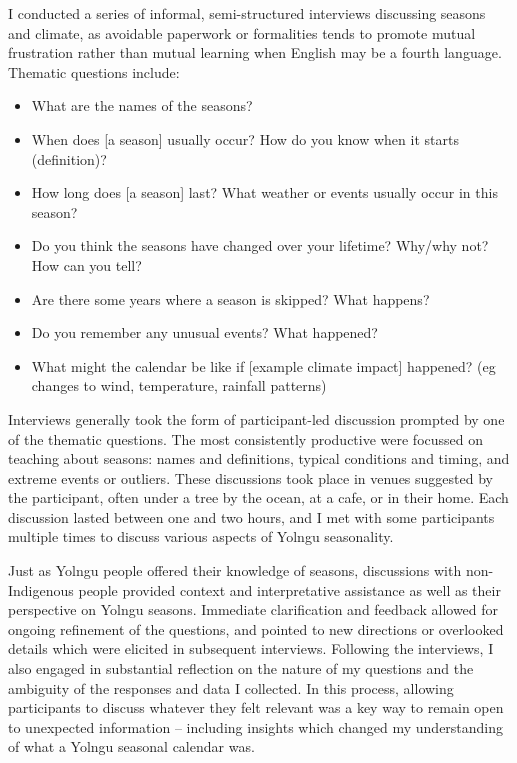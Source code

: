 I conducted a series of informal, semi-structured interviews discussing seasons
and climate, as avoidable paperwork or formalities tends to promote mutual
frustration rather than mutual learning when English may be a fourth language.
Thematic questions include:
\begin{itemize}
\item What are the names of the seasons?
\item When does [a season] usually occur?  How do you know when it starts (definition)?
\item How long does [a season] last?  What weather or events usually occur in this season?
\item Do you think the seasons have changed over your lifetime?  Why/why not?  How can you tell?
\item Are there some years where a season is skipped?  What happens?
\item Do you remember any unusual events?  What happened?
\item What might the calendar be like if [example climate impact] happened?
      (eg changes to wind, temperature, rainfall patterns)
\end{itemize}

Interviews generally took the form of participant-led discussion prompted
by one of the thematic questions.  The most consistently productive were
focussed on teaching about seasons: names and definitions, typical conditions
and timing, and extreme events or outliers.
%
These discussions took place in venues suggested by the participant, often
under a tree by the ocean, at a cafe, or in their home.  Each discussion
lasted between one and two hours, and I met with some participants multiple times
to discuss various aspects of Yolngu seasonality.

Just as Yolngu people offered their knowledge of seasons, discussions with
non-Indigenous people provided context and interpretative assistance as well
as their perspective on Yolngu seasons.  Immediate clarification and
feedback allowed for ongoing refinement of the questions, and pointed to
new directions or overlooked details which were elicited in subsequent
interviews.
%
Following the interviews, I also engaged in substantial reflection on the nature
of my questions and the ambiguity of the responses and data I collected.
In this process, allowing participants to discuss whatever they felt relevant
was a key way to remain open to unexpected information -- including insights
which changed my understanding of what a Yolngu seasonal calendar was.



